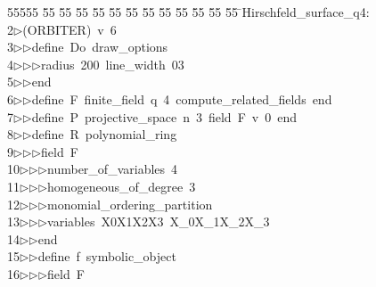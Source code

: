 %
%
\begin{tabbing}
55555 \= 55 \= 55 \= 55 \= 55 \= 55 \= 55 \= 55 \= 55 \= 55 \= 55 \= 55 \= 55 \= \>Hirschfeld\_surface\_q4:\\[0pt]
2\>$\triangleright$\>(ORBITER)\ v\ 6\ \\[0pt]
3\>$\triangleright$\>$\triangleright$\>define\ Do\ draw\_options\ \\[0pt]
4\>$\triangleright$\>$\triangleright$\>$\triangleright$\>radius\ 200\ line\_width\ 03\ \\[0pt]
5\>$\triangleright$\>$\triangleright$\>end\ \\[0pt]
6\>$\triangleright$\>$\triangleright$\>define\ F\ finite\_field\ q\ 4\ compute\_related\_fields\ end\ \\[0pt]
7\>$\triangleright$\>$\triangleright$\>define\ P\ projective\_space\ n\ 3\ field\ F\ v\ 0\ end\ \\[0pt]
8\>$\triangleright$\>$\triangleright$\>define\ R\ polynomial\_ring\ \\[0pt]
9\>$\triangleright$\>$\triangleright$\>$\triangleright$\>field\ F\ \\[0pt]
10\>$\triangleright$\>$\triangleright$\>$\triangleright$\>number\_of\_variables\ 4\ \\[0pt]
11\>$\triangleright$\>$\triangleright$\>$\triangleright$\>homogeneous\_of\_degree\ 3\ \\[0pt]
12\>$\triangleright$\>$\triangleright$\>$\triangleright$\>monomial\_ordering\_partition\ \\[0pt]
13\>$\triangleright$\>$\triangleright$\>$\triangleright$\>variables\ X0X1X2X3\ X\_0X\_1X\_2X\_3\ \\[0pt]
14\>$\triangleright$\>$\triangleright$\>end\ \\[0pt]
15\>$\triangleright$\>$\triangleright$\>define\ f\ symbolic\_object\ \\[0pt]
16\>$\triangleright$\>$\triangleright$\>$\triangleright$\>field\ F\ \\[0pt]

\end{tabbing}

